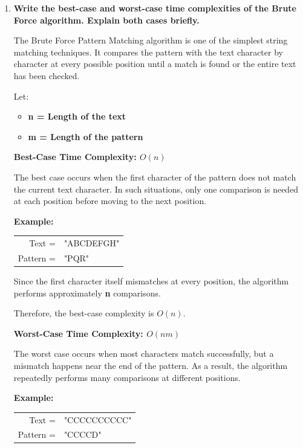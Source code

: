 
\begin{enumerate}[label=\textbf{\Alph*.}]

\item \textbf{Write the best-case and worst-case time complexities of the Brute
Force algorithm. Explain both cases briefly.}

The Brute Force Pattern Matching algorithm is one of the simplest string
matching techniques. It compares the pattern with the text character by
character at every possible position until a match is found or the entire
text has been checked.

Let:
\begin{itemize}
\item {\bfseries n = Length of the text}
\item {\bfseries m = Length of the pattern}
\end{itemize}
\vspace{0.5\baselineskip}

{\large\bfseries Best-Case Time Complexity: $O(n)$}

The best case occurs when the first character of the pattern does not match
the current text character. In such situations, only one comparison is needed
at each position before moving to the next position.

{\bfseries Example:}\\
\begin{tabular}{@{}rl@{}}
Text = & "ABCDEFGH"\\
Pattern = & "PQR"
\end{tabular}

Since the first character itself mismatches at every position, the algorithm
performs approximately \textbf{n} comparisons.

Therefore, the best-case complexity is $O(n)$.
\vspace{0.5\baselineskip}

{\large\bfseries Worst-Case Time Complexity: $O(nm)$}

The worst case occurs when most characters match successfully, but a mismatch
happens near the end of the pattern. As a result, the algorithm repeatedly
performs many comparisons at different positions.

{\bfseries Example:}\\
\begin{tabular}{@{}rl@{}}
Text = & "CCCCCCCCCC"\\
Pattern = & "CCCCD"
\end{tabular}


\end{enumerate}
